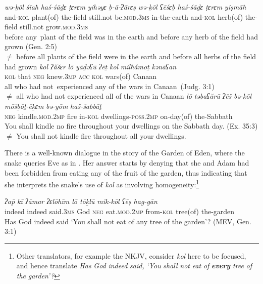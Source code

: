 \documentclass[output=paper]{langsci/langscibook}
\begin{document}
\ea%
    \label{ex:doron:29}
    \ea
    \gll \textit{wə-ḵōl}     \textit{śīaħ}         \textit{haś-śāḏɛ} \textit{ṭɛrɛm}     \textit{yihǝyɛ}           \textit{ḇ-ā-ʔārɛṣ}    \textit{wə{}-ḵōl    ʕēśɛḇ       haś-śāḏɛ ṭɛrɛm} \textit{yiṣmāħ}\\
         and-\textsc{kol} plant(of) the-field  still.not be.\textsc{mod.3ms} in-the-earth and-\textsc{kol} herb(of) the-field still.not grow.\textsc{mod.3ms}\\
    \glt before any~plant of the field was in the earth and before any herb of the field had grown (Gen. 2:5)\\ ${\neq}$  before all plants of the field were in the earth and before all herbs of the field had grown 
    \ex
    \gll \textit{kol}   \textit{ʔăšɛr} \textit{lō}     \textit{yāḏəʕū}      \textit{ʔēṯ}   \textit{kol}   \textit{milħămoṯ}   \textit{kənāʕan}\\
         \textsc{kol} that   \textsc{neg} knew.\textsc{3mp}  \textsc{acc} \textsc{kol} wars(of)    Canaan\\
    \glt all who had not~experienced any of the wars in Canaan~(Judg. 3:1)\\${\neq}$  all who had not experienced all of the wars in Canaan
    \ex  
    \gll \textit{lō}     \textit{təḇaʕărū}               \textit{ʔēš}  \textit{bə-ḵōl}   \textit{mōšḇōṯ-ēḵɛm}              \textit{bə-yōm}      \textit{haš-šabbāṯ}\\
         \textsc{neg} kindle.\textsc{mod.2mp}  fire  in-\textsc{kol} dwellings-\textsc{poss.2mp}  on-day(of) the-Sabbath\\
    \glt You shall kindle no fire throughout your dwellings on the Sabbath day.  (Ex. 35:3)\\${\neq}$  You shall not kindle fire throughout all your dwellings. 
    \z
\z

There is a well-known dialogue in the story of the Garden of Eden, where the snake queries Eve as in . Her answer starts by denying that she and Adam had been forbidden from eating any of the fruit of the garden, thus indicating that she interprets the snake’s use of \textit{kol} as involving homogeneity:\footnote{Other translators, for example the NKJV, consider \textit{kol} here to be focused, and hence translate \textrm{\textit{Has} \textit{God} \textit{indeed} \textit{said,} \textit{‘You} \textit{shall} \textit{not} \textit{eat} \textit{of} }\textrm{\textbf{\textit{every}}}\textrm{ \textit{tree} \textit{of} \textit{the} \textit{garden’?}}}

\ea%
    \label{ex:doron:30}
    \gll \textit{ʔa\={p}        kī         ʔāmar     ʔɛlōhīm  lō     tōḵlū               mik-kōl     ʕēṣ        hag-gān}\\
         indeed  indeed  said.\textsc{3ms}  God       \textsc{neg} eat\textsc{.mod.2mp} from-\textsc{kol} tree(of) the-garden  \\
    \glt Has God indeed said ‘You shall not eat of any tree of the garden’?  (MEV, Gen. 3:1)
    \z
\end{document}
